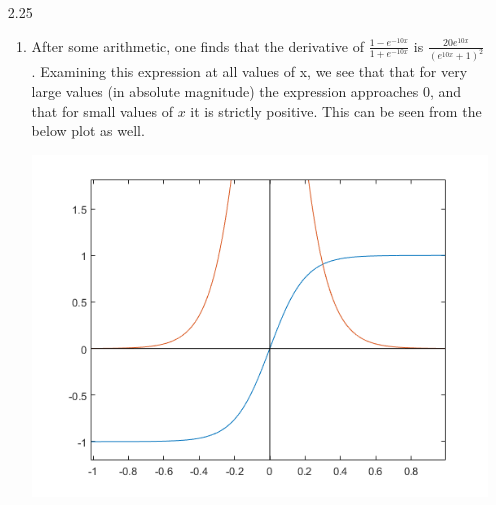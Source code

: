 \documentclass[11pt,a4paper]{article}
\begin{document}
\begin{itemize}
\begin{enumerate} [label={\alph*)}]
					Now we can see that in order to get rid of the absolute value symbol, when $f'>0$ then the numerator is positive and we can get rid of it, no problem. If $f'<0$ then the absolute value would indicate we need to subtract subtract the negative so we still have a positive value in the numerator. Depending on what sign $f'$ takes we will want to select the sign that allows us to cancel out both terms.
					\item We know from the Newton Method that $x_{i+1} = x_i - \frac{f(x_i)}{f'(x_i)}$. By rearranging the terms we can solve for the equation given in the problem as follows:
					\begin{align*}
						x_{i+1} &= x_i - \frac{f(x_i)}{f'(x_i)} \\
						x_{i+1} - x_i &=  - \frac{f(x_i)}{f'(x_i)} \\
						(x_{i+1} - x_i)(x_{i+1} - x_i) &=  - (x_{i+1} - x_i) \frac{f(x_i)}{f'(x_i)} \\
						(x_{i+1} - x_i)^2 &=  - (x_{i+1} - x_i) \frac{f(x_i)}{f'(x_i)}
					\end{align*}
					Substituting this into our second-order Taylor approximation gives the following:
					\begin{align*}
						0 &= f(x_i) + f'(x_i)(x_{i+1}-x_i) - \frac{1}{2}f''(x_i)(x_{i+1} - x_i) \frac{f(x_i)}{f'(x_i)} \\
						0 &= f(x_i) + (x_{i+1}-x_i)\Big[f'(x_i) - \frac{1}{2}f''(x_i)\frac{f(x_i)}{f'(x_i)}\Big] \\
						x_{i+1} &= x_i - \frac{f(x_i)}{f'(x_i) - \frac{1}{2}f''(x_i)\frac{f(x_i)}{f'(x_i)}}*\frac{2f'(x_i)}{2f'(x_i)}\\
						x_{i+1} &= x_i - \frac{2f(x_i)f'(x_i)}{2f'(x_i)^2 - f''(x_i)f(x_i)}
					\end{align*}
				\end{enumerate}
			\item[2.25]
				\begin{enumerate} [label={\alph*)}]
					\item After some arithmetic, one finds that the derivative of $\frac{1-e^{-10x}}{1+e^{-10x}}$ is $\frac{20e^{10x}}{(e^{10x}+1)^2}$. Examining this expression at all values of x, we see that that for very large values (in absolute magnitude) the expression approaches 0, and that for small values of $x$ it is strictly positive. This can be seen from the below plot as well.
					\begin{center}
						\includegraphics[width=.75\linewidth]{ch2q25c}

\end{center}
\end{enumerate}
\end{itemize}
\end{document}
